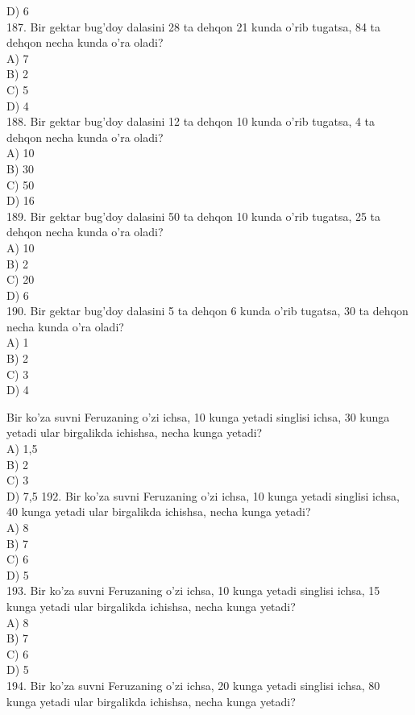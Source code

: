 D) 6\\
187. Bir gektar bug'doy dalasini 28 ta dehqon 21 kunda o'rib tugatsa, 84 ta dehqon necha kunda o'ra oladi?\\
A) 7\\
B) 2\\
C) 5\\
D) 4\\
188. Bir gektar bug'doy dalasini 12 ta dehqon 10 kunda o'rib tugatsa, 4 ta dehqon necha kunda o'ra oladi?\\
A) 10\\
B) 30\\
C) 50\\
D) 16\\
189. Bir gektar bug'doy dalasini 50 ta dehqon 10 kunda o'rib tugatsa, 25 ta dehqon necha kunda o'ra oladi?\\
A) 10\\
B) 2\\
C) 20\\
D) 6\\
190. Bir gektar bug'doy dalasini 5 ta dehqon 6 kunda o'rib tugatsa, 30 ta dehqon necha kunda o'ra oladi?\\
A) 1\\
B) 2\\
C) 3\\
D) 4
  \item Bir ko'za suvni Feruzaning o'zi ichsa, 10 kunga yetadi singlisi ichsa, 30 kunga yetadi ular birgalikda ichishsa, necha kunga yetadi?\\
A) 1,5\\
B) 2\\
C) 3\\
D) 7,5
192. Bir ko'za suvni Feruzaning o'zi ichsa, 10 kunga yetadi singlisi ichsa, 40 kunga yetadi ular birgalikda ichishsa, necha kunga yetadi?\\
A) 8\\
B) 7\\
C) 6\\
D) 5\\
193. Bir ko'za suvni Feruzaning o'zi ichsa, 10 kunga yetadi singlisi ichsa, 15 kunga yetadi ular birgalikda ichishsa, necha kunga yetadi?\\
A) 8\\
B) 7\\
C) 6\\
D) 5\\
194. Bir ko'za suvni Feruzaning o'zi ichsa, 20 kunga yetadi singlisi ichsa, 80 kunga yetadi ular birgalikda ichishsa, necha kunga yetadi?\\
